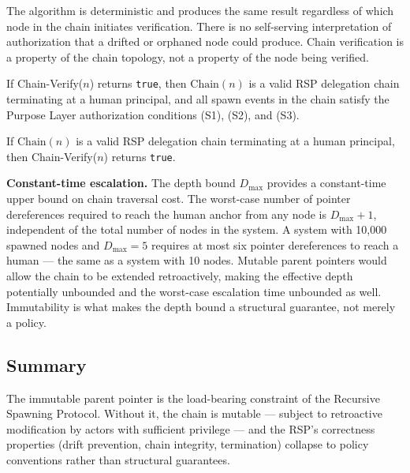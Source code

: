 The algorithm is deterministic and produces the same result regardless of which node in the chain initiates verification. There is no self-serving interpretation of authorization that a drifted or orphaned node could produce. Chain verification is a property of the chain topology, not a property of the node being verified.

\begin{prop}
\label{prop:chain-verify-soundness}
If Chain-Verify($n$) returns \texttt{true}, then $\mathrm{Chain}(n)$ is a valid RSP delegation chain terminating at a human principal, and all spawn events in the chain satisfy the Purpose Layer authorization conditions (S1), (S2), and (S3).
\end{prop}

\begin{prop}
\label{prop:chain-verify-completeness}
If $\mathrm{Chain}(n)$ is a valid RSP delegation chain terminating at a human principal, then Chain-Verify($n$) returns \texttt{true}.
\end{prop}

\medskip
\noindent\textbf{Constant-time escalation.} The depth bound $D_{\max}$ provides a constant-time upper bound on chain traversal cost. The worst-case number of pointer dereferences required to reach the human anchor from any node is $D_{\max} + 1$, independent of the total number of nodes in the system. A system with 10,000 spawned nodes and $D_{\max} = 5$ requires at most six pointer dereferences to reach a human --- the same as a system with 10 nodes. Mutable parent pointers would allow the chain to be extended retroactively, making the effective depth potentially unbounded and the worst-case escalation time unbounded as well. Immutability is what makes the depth bound a structural guarantee, not merely a policy.

\subsection{Summary}
\label{sec:immutable-parent-pointers-summary}

The immutable parent pointer is the load-bearing constraint of the Recursive Spawning Protocol. Without it, the chain is mutable --- subject to retroactive modification by actors with sufficient privilege --- and the RSP's correctness properties (drift prevention, chain integrity, termination) collapse to policy conventions rather than structural guarantees.

